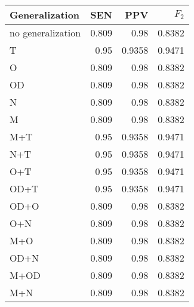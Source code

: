 \begin{table}[htbp]
  \caption{}
  \label{tab:}
  \centering
  \begin{tabular}[h]{@{}lrrr@{}}
    \toprule
    Generalization & SEN & PPV & \(F_2\) \\
    \midrule
no generalization	&	0.809	&	0.98	&	0.8382 \\
T	&	0.95	&	0.9358	&	0.9471 \\
O	&	0.809	&	0.98	&	0.8382 \\
OD	&	0.809	&	0.98	&	0.8382 \\
N	&	0.809	&	0.98	&	0.8382 \\
M	&	0.809	&	0.98	&	0.8382 \\
M+T	&	0.95	&	0.9358	&	0.9471 \\
N+T	&	0.95	&	0.9358	&	0.9471 \\
O+T	&	0.95	&	0.9358	&	0.9471 \\
OD+T	&	0.95	&	0.9358	&	0.9471 \\
OD+O	&	0.809	&	0.98	&	0.8382 \\
O+N	&	0.809	&	0.98	&	0.8382 \\
M+O	&	0.809	&	0.98	&	0.8382 \\
OD+N	&	0.809	&	0.98	&	0.8382 \\
M+OD	&	0.809	&	0.98	&	0.8382 \\
M+N	&	0.809	&	0.98	&	0.8382 \\
    \bottomrule
  \end{tabular}
\end{table}
